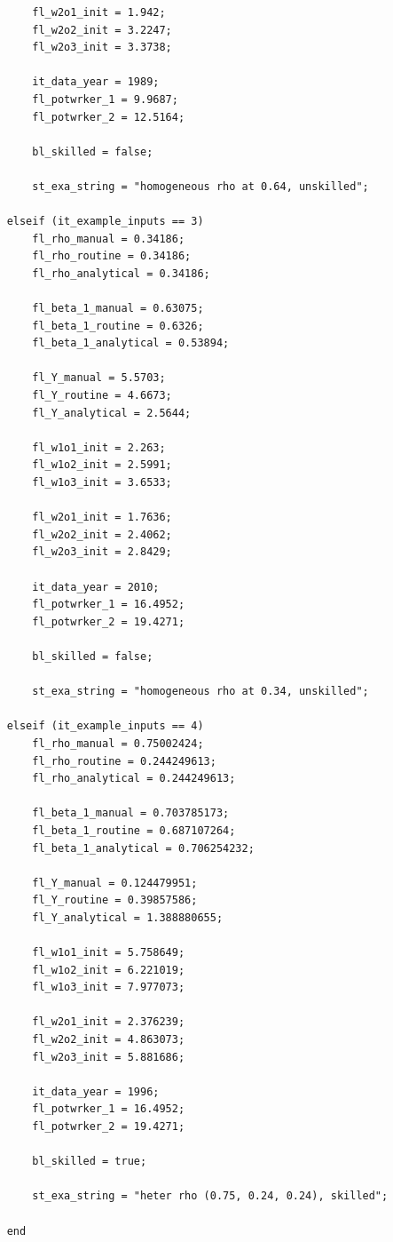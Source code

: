 \documentclass[
]{book}
\begin{document}
\begin{verbatim}
        fl_w2o1_init = 1.942;
        fl_w2o2_init = 3.2247;
        fl_w2o3_init = 3.3738;

        it_data_year = 1989;
        fl_potwrker_1 = 9.9687;
        fl_potwrker_2 = 12.5164;

        bl_skilled = false;

        st_exa_string = "homogeneous rho at 0.64, unskilled";

    elseif (it_example_inputs == 3)
        fl_rho_manual = 0.34186;
        fl_rho_routine = 0.34186;
        fl_rho_analytical = 0.34186;

        fl_beta_1_manual = 0.63075;
        fl_beta_1_routine = 0.6326;
        fl_beta_1_analytical = 0.53894;

        fl_Y_manual = 5.5703;
        fl_Y_routine = 4.6673;
        fl_Y_analytical = 2.5644;

        fl_w1o1_init = 2.263;
        fl_w1o2_init = 2.5991;
        fl_w1o3_init = 3.6533;

        fl_w2o1_init = 1.7636;
        fl_w2o2_init = 2.4062;
        fl_w2o3_init = 2.8429;

        it_data_year = 2010;
        fl_potwrker_1 = 16.4952;
        fl_potwrker_2 = 19.4271;

        bl_skilled = false;

        st_exa_string = "homogeneous rho at 0.34, unskilled";

    elseif (it_example_inputs == 4)
        fl_rho_manual = 0.75002424;
        fl_rho_routine = 0.244249613;
        fl_rho_analytical = 0.244249613;

        fl_beta_1_manual = 0.703785173;
        fl_beta_1_routine = 0.687107264;
        fl_beta_1_analytical = 0.706254232;

        fl_Y_manual = 0.124479951;
        fl_Y_routine = 0.39857586;
        fl_Y_analytical = 1.388880655;

        fl_w1o1_init = 5.758649;
        fl_w1o2_init = 6.221019;
        fl_w1o3_init = 7.977073;

        fl_w2o1_init = 2.376239;
        fl_w2o2_init = 4.863073;
        fl_w2o3_init = 5.881686;

        it_data_year = 1996;
        fl_potwrker_1 = 16.4952;
        fl_potwrker_2 = 19.4271;

        bl_skilled = true;

        st_exa_string = "heter rho (0.75, 0.24, 0.24), skilled";

    end


\end{verbatim}
\end{document}
